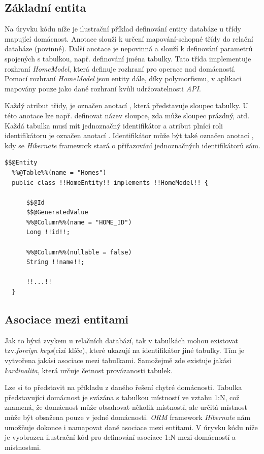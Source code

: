 \subsection*{Základní entita}

Na úryvku kódu níže je ilustrační příklad definování entity databáze u třídy mapující domácnost.
Anotace  slouží k určení mapování-schopné třídy do relační databáze (povinné).
Další anotace  je nepovinná a slouží k definování parametrů spojených s tabulkou, např. definování jména tabulky.
Tato třída implementuje rozhraní \emph{HomeModel}, která definuje rozhraní pro operace nad domácností.
Pomocí rozhraní \emph{HomeModel} jsou entity dále, díky polymorfismu, v aplikaci mapovány pouze jako dané rozhraní kvůli udržovatelnosti \emph{API}.

Každý atribut třidy, je označen anotací , která představuje sloupec tabulky.
U této anotace lze např. definovat název sloupce, zda může sloupec prázdný, atd.
Každá tabulka musí mít jednoznačný identifikátor a atribut plnící roli identifikátoru je označen anotací .
Identifikátor může být také označen anotací , kdy se \emph{Hibernate} framework stará o přiřazování jednoznačných identifikátorů sám.

\begin{lstlisting}[style=JavaStyle, caption={Ukázka definování entity}]
  $$@Entity
  %%@Table%%(name = "Homes")
  public class !!HomeEntity!! implements !!HomeModel!! {
  
      $$@Id
      $$@GeneratedValue
      %%@Column%%(name = "HOME_ID")
      Long !!id!!;
  
      %%@Column%%(nullable = false)
      String !!name!!;

      !!...!!
  }
\end{lstlisting}

\newpage
\subsection*{Asociace mezi entitami}
Jak to bývá zvykem u relačních databází, tak v tabulkách mohou existovat tzv.\emph{foreign keys}(cizí klíče), které ukazují na identifikátor jiné tabulky.
Tím je vytvořena jakási asociace mezi tabulkami.
Samožejmě zde existuje jakási \emph{kardinalita}, která určuje četnost provázanosti tabulek.

Lze si to představit na příkladu z daného řešení chytré domácnosti.
Tabulka představující domácnost je svázána s tabulkou místností ve vztahu 1:N, což znamená, že domácnost může obsahovat několik místností, ale určitá místnost může být obsažena pouze v jedné domácnosti.
\emph{ORM} framework \emph{Hibernate} nám umožňuje dokonce i namapovat dané asociace mezi entitami.
V úryvku kódu níže je vyobrazen ilustrační kód pro definování asociace 1:N mezi domácností a místnostmi.

